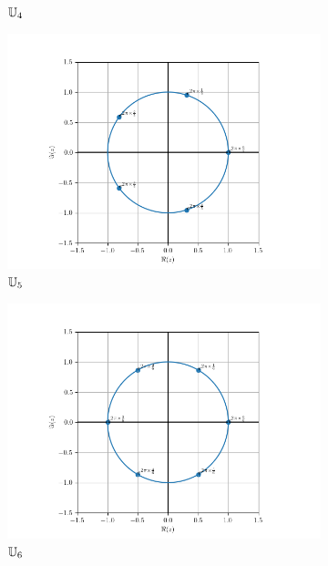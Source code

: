 \begin{figure}
\begin{subfigure}{.3\textwidth}
    \caption{$\mathbb{U}_4$}
    \label{fig:U4}      
  \end{subfigure}
  \begin{subfigure}{.3\textwidth}
    \centering
    \includegraphics[scale = 0.33]{U_5.png}  
    \caption{$\mathbb{U}_5$}
    \label{fig:U5}      
  \end{subfigure}
  \newline
  \begin{subfigure}{.3\textwidth}
    \centering
    \includegraphics[scale = 0.33]{U_6.png}  
    \caption{$\mathbb{U}_6$}
    \label{fig:U6}      
  \end{subfigure}
  \begin{subfigure}{.3\textwidth}

\end{subfigure}
\end{figure}
